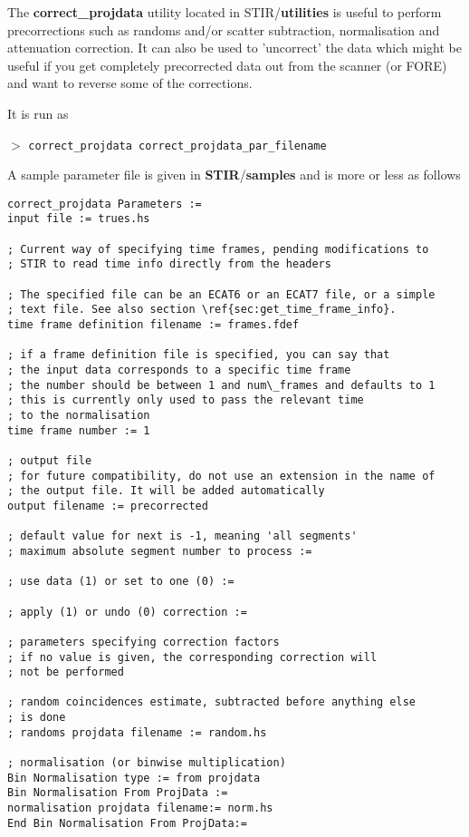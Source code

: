 \documentclass{article}
\newcommand{\cmdline}[1]{\par \noindent $>$ \texttt{#1}\par}
\begin{document}
{{{The \textbf{correct\_projdata} utility located in STIR/\textbf{utilities} 
is useful to perform precorrections such as randoms and/or scatter 
subtraction, normalisation and attenuation correction. It can 
also be used to 'uncorrect' the data which might be useful if 
you get completely precorrected data out from the scanner (or 
FORE) and want to reverse some of the corrections.


It is run as
\cmdline{correct\_projdata correct\_projdata\_par\_filename}


A sample parameter file is given in \textbf{STIR}/\textbf{samples} and 
is more or less as follows

\begin{verbatim}
correct_projdata Parameters := 
input file := trues.hs

; Current way of specifying time frames, pending modifications to
; STIR to read time info directly from the headers

; The specified file can be an ECAT6 or an ECAT7 file, or a simple
; text file. See also section \ref{sec:get_time_frame_info}. 
time frame definition filename := frames.fdef

; if a frame definition file is specified, you can say that 
; the input data corresponds to a specific time frame
; the number should be between 1 and num\_frames and defaults to 1
; this is currently only used to pass the relevant time 
; to the normalisation 
time frame number := 1

; output file
; for future compatibility, do not use an extension in the name of 
; the output file. It will be added automatically 
output filename := precorrected

; default value for next is -1, meaning 'all segments' 
; maximum absolute segment number to process :=  

; use data (1) or set to one (0) := 

; apply (1) or undo (0) correction := 

; parameters specifying correction factors 
; if no value is given, the corresponding correction will
; not be performed

; random coincidences estimate, subtracted before anything else 
; is done
; randoms projdata filename := random.hs 

; normalisation (or binwise multiplication) 
Bin Normalisation type := from projdata 
Bin Normalisation From ProjData := 
normalisation projdata filename:= norm.hs 
End Bin Normalisation From ProjData:=


\end{verbatim}}}}
\end{document}
